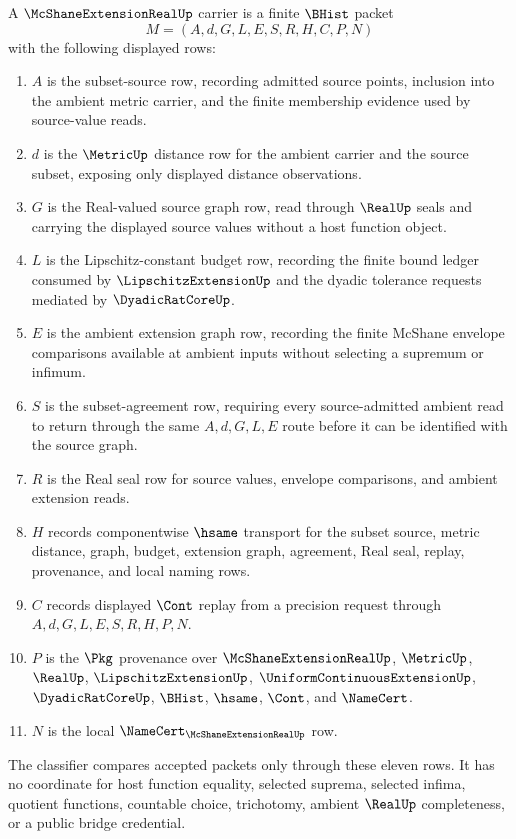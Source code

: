 \begin{definition}
\label{def:mcshane-extension-real-carrier}
A $\McShaneExtensionRealUp$ carrier is a finite $\BHist$ packet
$$
M=(A,d,G,L,E,S,R,H,C,P,N)
$$
with the following displayed rows:
\begin{enumerate}
\item $A$ is the subset-source row, recording admitted source points, inclusion into the ambient metric carrier, and the finite membership evidence used by source-value reads.
\item $d$ is the $\MetricUp$ distance row for the ambient carrier and the source subset, exposing only displayed distance observations.
\item $G$ is the Real-valued source graph row, read through $\RealUp$ seals and carrying the displayed source values without a host function object.
\item $L$ is the Lipschitz-constant budget row, recording the finite bound ledger consumed by $\LipschitzExtensionUp$ and the dyadic tolerance requests mediated by $\DyadicRatCoreUp$.
\item $E$ is the ambient extension graph row, recording the finite McShane envelope comparisons available at ambient inputs without selecting a supremum or infimum.
\item $S$ is the subset-agreement row, requiring every source-admitted ambient read to return through the same $A,d,G,L,E$ route before it can be identified with the source graph.
\item $R$ is the Real seal row for source values, envelope comparisons, and ambient extension reads.
\item $H$ records componentwise $\hsame$ transport for the subset source, metric distance, graph, budget, extension graph, agreement, Real seal, replay, provenance, and local naming rows.
\item $C$ records displayed $\Cont$ replay from a precision request through $A,d,G,L,E,S,R,H,P,N$.
\item $P$ is the $\Pkg$ provenance over $\McShaneExtensionRealUp$, $\MetricUp$, $\RealUp$, $\LipschitzExtensionUp$, $\UniformContinuousExtensionUp$, $\DyadicRatCoreUp$, $\BHist$, $\hsame$, $\Cont$, and $\NameCert$.
\item $N$ is the local $\NameCert_{\McShaneExtensionRealUp}$ row.
\end{enumerate}
The classifier compares accepted packets only through these eleven rows. It has no coordinate for host function equality, selected suprema, selected infima, quotient functions, countable choice, trichotomy, ambient $\RealUp$ completeness, or a public bridge credential.
\end{definition}

